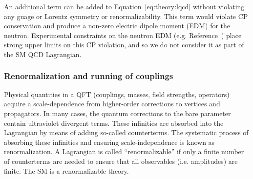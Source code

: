 An additional term can be added to Equation~\ref{eq:theory:lqcd} without violating any guage or Lorentz symmetry or renormalizability.
This term would violate CP conservation and produce a non-zero electric dipole moment (EDM) for the neutron.
Experimental constraints on the neutron EDM (e.g. Reference~\cite{nedm1}) place strong upper limits on this CP violation, and so we do not consider it as part of the SM QCD Lagrangian. 

\subsubsection{Renormalization and running of couplings}

Physical quantities in a QFT (couplings, masses, field strengths, operators) acquire a scale-dependence from higher-order corrections to vertices and propagators. 
In many cases, the quantum corrections to the bare parameter contain ultraviolet divergent terms.
These infinities are absorbed into the Lagrangian by means of adding so-called counterterms. 
The systematic process of absorbing these infinities and ensuring scale-independence is known as renormalization.
A Lagrangian is called ``renormalizable'' if only a finite number of counterterms are needed to ensure that all observables (i.e. amplitudes) are finite. 
The SM is a renormalizable theory.


